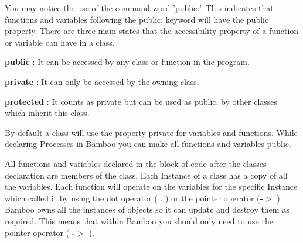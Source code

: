  You may notice the use of the command word 'public:'. This indicates that functions and variables following the public: keyword will have the public property. There are three main states that the accessibility property of a function or variable can have in a class.
\begin{DoxyItemize}
\item {\bfseries public} : It can be accessed by any class or function in the program.
\item {\bfseries private} : It can only be accessed by the owning class.
\item {\bfseries protected} : It counts as private but can be used as public, by other classes which inherit this class.
\end{DoxyItemize}By default a class will use the property private for variables and functions. While declaring Processes in Bamboo you can make all functions and variables public.\par
 All functions and variables declared in the block of code after the classes declaration are members of the class. Each Instance of a class has a copy of all the variables. Each function will operate on the variables for the specific Instance which called it by using the dot operator ( {\bfseries }. ) or the pointer operator ({\bfseries -\/$>$} ). Bamboo owns all the instances of objects so it can update and destroy them as required. This means that within Bamboo you should only need to use the pointer operator ( {\bfseries -\/$>$} ). \par


